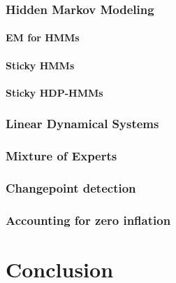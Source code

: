 \documentclass{report}
\begin{document}
\subsection{Hidden Markov Modeling}

\subsubsection{EM for HMMs}

\subsubsection{Sticky HMMs}

\subsubsection{Sticky HDP-HMMs}

\subsection{Linear Dynamical Systems}

\subsection{Mixture of Experts}

\subsection{Changepoint detection}

\subsection{Accounting for zero inflation}

\chapter{Conclusion}



\end{document}
